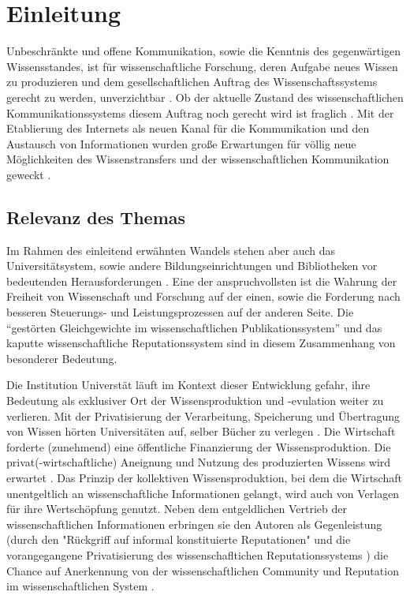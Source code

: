\chapter{Einleitung}

Unbeschränkte und offene Kommunikation, sowie die Kenntnis des gegenwärtigen Wissensstandes, ist für wissenschaftliche Forschung, deren Aufgabe neues Wissen zu produzieren und dem gesellschaftlichen Auftrag des Wissenschaftssystems gerecht zu werden, unverzichtbar \cite{Hanekop_2014} \cite{glaeser2006} \cite{gibbons_1994} \cite{Luhmann1998}. Ob der aktuelle Zustand des wissenschaftlichen Kommunikationssystems diesem Auftrag noch gerecht wird ist fraglich \cite{Schekman_2013}. Mit der Etablierung des Internets als neuen Kanal für die Kommunikation und den Austausch von Informationen wurden große Erwartungen für völlig neue Möglichkeiten des Wissenstransfers und der wissenschaftlichen Kommunikation geweckt \cite{Hanekop_2014} \cite{schulze_2013_open} \cite{albert_2006_open_implications} \cite{Goodrum_2001} \cite{Lawrence_1999}.

\section{Relevanz des Themas}

Im Rahmen des einleitend erwähnten Wandels stehen aber auch das Universitätsystem, sowie andere Bildungseinrichtungen und Bibliotheken vor bedeutenden Herausforderungen \cite{Harter2006} \cite{Gu_don_2004} \cite{osterloh2008anreize}. Eine der anspruchvollsten ist die Wahrung der Freiheit von Wissenschaft und Forschung auf der einen, sowie die Forderung nach besseren Steuerungs- und Leistungsprozessen \cite{Adler_2009} \cite{gibbons_1994} auf der anderen Seite. Die “gestörten Gleichgewichte im wissenschaftlichen Publikationssystem” \cite{cite:0} und das kaputte wissenschaftliche Reputationssystem \cite{suchen} sind in diesem Zusammenhang von besonderer Bedeutung.

Die Institution Universtät läuft im Kontext dieser Entwicklung gefahr, ihre Bedeutung als exklusiver Ort der Wissensproduktion \cite{suchen} und -evulation \cite{suchen} weiter zu verlieren. Mit der Privatisierung der Verarbeitung, Speicherung und Übertragung von Wissen hörten Universitäten auf, selber Bücher zu verlegen \cite{cite:0}. Die Wirtschaft forderte (zunehmend) eine öffentliche Finanzierung der Wissensproduktion. Die privat(-wirtschaftliche) Aneignung und Nutzung des produzierten Wissens wird erwartet \cite{cite:2}. Das Prinzip der kollektiven Wissensproduktion, bei dem die Wirtschaft unentgeltlich an wissenschaftliche Informationen gelangt, wird auch von Verlagen für ihre Wertschöpfung genutzt. Neben dem entgeldlichen Vertrieb der wissenschaftlichen Informationen erbringen sie den Autoren als Gegenleistung (durch den "Rückgriff auf informal konstituierte Reputationen" \cite{luhmann_1970_selbststeuerung} und die vorangegangene Privatisierung des wissenschafltichen Reputationssystems \cite{suchen}) die Chance auf Anerkennung von der wissenschaftlichen Community und Reputation im wissenschaftlichen System \cite{cite:21a}.

